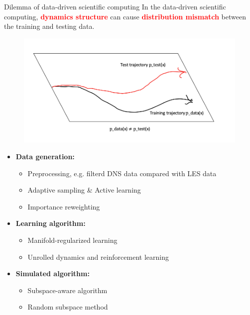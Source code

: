 \documentclass{beamer}
\begin{document}
\begin{frame}{Dilemma of data-driven scientific computing}
	In the data-driven scientific computing, \textcolor{red}{\textbf{dynamics structure}} can cause \textcolor{red}{\textbf{distribution mismatch}} between the training and testing data.
	\begin{figure}[H]
          \centering
          \centerline{\includegraphics[width=\linewidth]{fig/dilemma.png}}
        \end{figure}
\end{frame}

\begin{frame}
	\begin{itemize}
		\item \textbf{Data generation:}
		\begin{itemize}
			\item Preprocessing, e.g. filterd DNS data compared with LES data
			\item Adaptive sampling \& Active learning
			\item Importance reweighting
		\end{itemize}
		\item \textbf{Learning algorithm:}
		\begin{itemize}
			\item Manifold-regularized learning
			\item Unrolled dynamics and reinforcement learning
		\end{itemize}
		\item \textbf{Simulated algorithm:}
		\begin{itemize}
			\item Subspace-aware algorithm
			\item Random subspace method
		\end{itemize}
	\end{itemize}
\end{frame}
\end{document}
